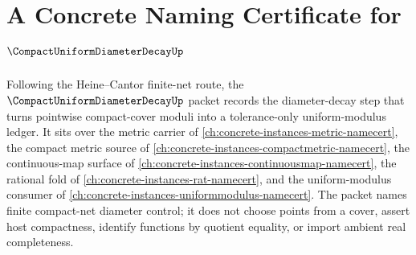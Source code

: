 \chapter{A Concrete Naming Certificate for $\CompactUniformDiameterDecayUp$}
\label{ch:concrete-instances-compact-uniform-diameter-decay-namecert}

Following the Heine--Cantor finite-net route, the $\CompactUniformDiameterDecayUp$ packet records the diameter-decay step that turns pointwise compact-cover moduli into a tolerance-only uniform-modulus ledger. It sits over the metric carrier of \autoref{ch:concrete-instances-metric-namecert}, the compact metric source of \autoref{ch:concrete-instances-compactmetric-namecert}, the continuous-map surface of \autoref{ch:concrete-instances-continuousmap-namecert}, the rational fold of \autoref{ch:concrete-instances-rat-namecert}, and the uniform-modulus consumer of \autoref{ch:concrete-instances-uniformmodulus-namecert}. The packet names finite compact-net diameter control; it does not choose points from a cover, assert host compactness, identify functions by quotient equality, or import ambient real completeness.

